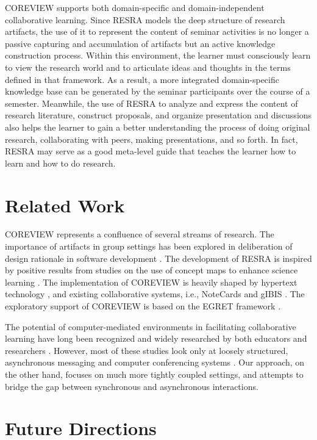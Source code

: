 COREVIEW supports both domain-specific and domain-independent collaborative
learning. Since RESRA models the deep structure of research artifacts, the
use of it to represent the content of seminar activities is no longer a
passive capturing and accumulation of artifacts but an active knowledge
construction process. Within this environment, the learner must consciously
learn to view the research world and to articulate ideas and thoughts in
the terms defined in that framework. As a result, a more integrated
domain-specific knowledge base can be generated by the seminar participants
over the course of a semester. Meanwhile, the use of RESRA to analyze and
express the content of research literature, construct proposals, and
organize presentation and discussions also helps the learner to gain a
better understanding the process of doing original research, collaborating
with peers, making presentations, and so forth. In fact, RESRA may serve as
a good meta-level guide that teaches the learner how to learn and how to
do research.


\section{Related Work}

COREVIEW represents a confluence of several streams of research. The
importance of artifacts in group settings has been explored in deliberation
of design rationale in software development \cite{Lee90}. The development
of RESRA is inspired by positive results from studies on the use of concept
maps to enhance science learning \cite{Cliburn90}. The implementation of
COREVIEW is heavily shaped by hypertext technology
\cite{Conklin88Gibis,Halasz88Reflections}, and existing collaborative
systems, i.e., NoteCards \cite{Halasz87Notecards} and gIBIS
\cite{Conklin88Gibis}. The exploratory support of COREVIEW is based on the
EGRET framework \cite{csdl-92-01}.

The potential of computer-mediated environments in facilitating
collaborative learning have long been recognized and widely researched by
both educators and researchers \cite{Hiltz88Collaborative,Butler92}.
However, most of these studies look only at loosely structured,
asynchronous messaging \cite{Butler92} and computer conferencing systems
\cite{Hiltz88Collaborative}.  Our approach, on the other hand, focuses on
much more tightly coupled settings, and attempts to bridge the gap between
synchronous and asynchronous interactions.


\section{Future Directions}

